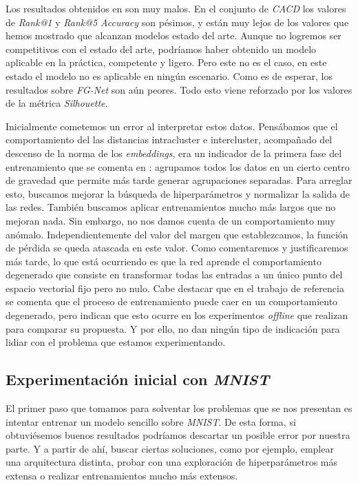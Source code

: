 Los resultados obtenidos en  son muy malos. En el conjunto de \textit{CACD} los valores de \textit{Rank@1} y \textit{Rank@5 Accuracy} son pésimos, y están muy lejos de los valores que hemos mostrado que alcanzan modelos estado del arte. Aunque no logremos ser competitivos con el estado del arte, podríamos haber obtenido un modelo aplicable en la práctica, competente y ligero. Pero este no es el caso, en este estado el modelo no es aplicable en ningún escenario. Como es de esperar, los resultados sobre \textit{FG-Net} son aún peores. Todo esto viene reforzado por los valores de la métrica \textit{Silhouette}.

Inicialmente cometemos un error al interpretar estos datos. Pensábamos que el comportamiento del las distancias intracluster e intercluster, acompañado del descenso de la norma de los \textit{embeddings}, era un indicador de la primera fase del entrenamiento que se comenta en \cite{informatica:principal}: agrupamos todos los datos en un cierto centro de gravedad que permite más tarde generar agrupaciones separadas. Para arreglar esto, buscamos mejorar la búsqueda de hiperparámetros y normalizar la salida de las redes. También buscamos aplicar entrenamientos mucho más largos que no mejoran nada. Sin embargo, no nos damos cuenta de un comportamiento muy anómalo. Independientemente del valor del margen que establezcamos, la función de pérdida se queda atascada en este valor. Como comentaremos y justificaremos más tarde, lo que está ocurriendo es que la red aprende el comportamiento degenerado que consiste en transformar todas las entradas a un único punto del espacio vectorial fijo pero no nulo.  Cabe destacar que en el trabajo de referencia \cite{informatica:principal} se comenta que el proceso de entrenamiento puede caer en un comportamiento degenerado, pero indican que esto ocurre en los experimentos \textit{offline} que realizan para comparar su propuesta. Y por ello, no dan ningún tipo de indicación para lidiar con el problema que estamos experimentando.

\subsection{Experimentación inicial con \textit{MNIST}} \label{isubsec:experimentos_iniciales_mnist}

El primer paso que tomamos para solventar los problemas que se nos presentan es intentar entrenar un modelo sencillo sobre \textit{MNIST}. De esta forma, si obtuviésemos buenos resultados podríamos descartar un posible error por nuestra parte. Y a partir de ahí, buscar ciertas soluciones, como por ejemplo, emplear una arquitectura distinta, probar con una exploración de hiperparámetros más extensa o realizar entrenamientos mucho más extensos.

